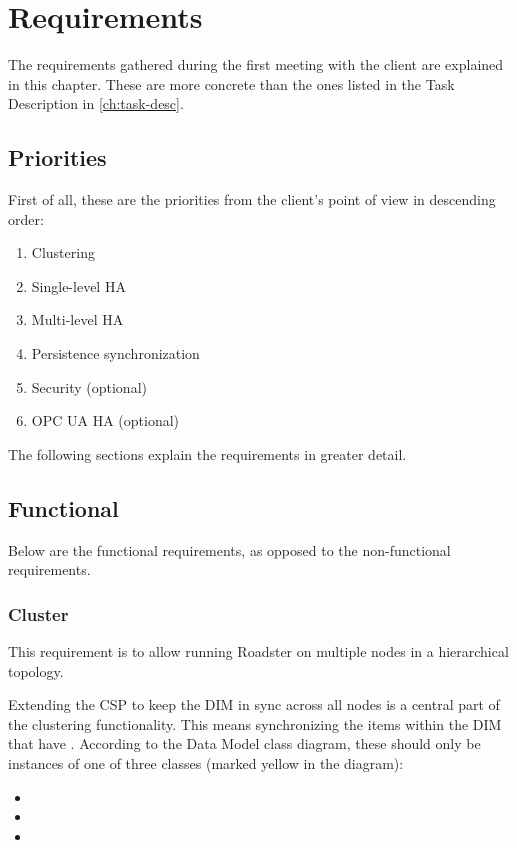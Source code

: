 \chapter{Requirements}
The requirements gathered during the first meeting with the client are
explained in this chapter. These are more concrete than the ones listed in the
Task Description in \autoref{ch:task-desc}.

\section{Priorities}
First of all, these are the priorities from the client's point of view in
descending order:

\begin{enumerate}
\item Clustering
\item Single-level \gls{HA}
\item Multi-level \gls{HA}
\item Persistence synchronization
\item Security (optional)
\item OPC UA \gls{HA} (optional)
\end{enumerate}

The following sections explain the requirements in greater detail.

\section{Functional}
Below are the functional requirements, as opposed to the non-functional
requirements.


\subsection{Cluster}
This requirement is to allow running Roadster on multiple nodes in a
hierarchical topology.

Extending the \gls{CSP} to keep the DIM in sync across all nodes is a central
part of the clustering functionality. This means synchronizing the
items within the DIM that have . According to
the Data Model class diagram, these should only be instances of one of three
classes (marked yellow in the diagram):
\begin{itemize}
	\item {}
	\item {}
	\item {}
\end{itemize}

